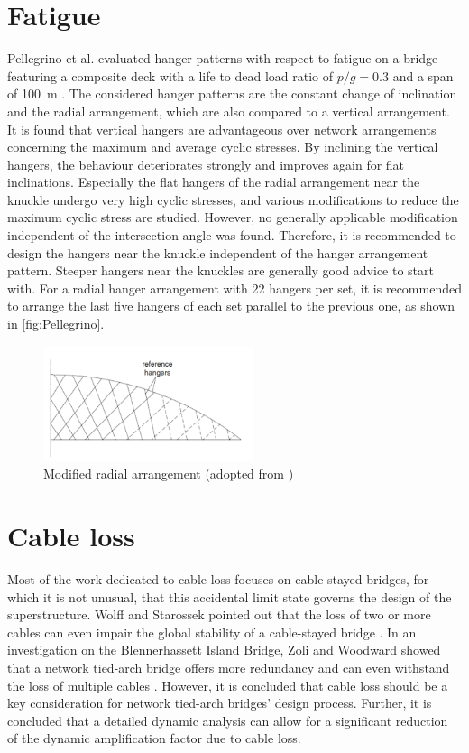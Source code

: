 \section{Fatigue} \label{sec:rev_fat}
Pellegrino et al. evaluated hanger patterns with respect to fatigue on a bridge featuring a composite deck with a life to dead load ratio of $p/g=0.3$ and a span of \SI{100}{m} \cite{Pellegrino}. The considered hanger patterns are the constant change of inclination and the radial arrangement, which are also compared to a vertical arrangement. It is found that vertical hangers are advantageous over network arrangements concerning the maximum and average cyclic stresses. By inclining the vertical hangers, the behaviour deteriorates strongly and improves again for flat inclinations. Especially the flat hangers of the radial arrangement near the knuckle undergo very high cyclic stresses, and various modifications to reduce the maximum cyclic stress are studied. However, no generally applicable modification independent of the intersection angle was found. Therefore, it is recommended to design the hangers near the knuckle independent of the hanger arrangement pattern. Steeper hangers near the knuckles are generally good advice to start with. For a radial hanger arrangement with 22 hangers per set, it is recommended to arrange the last five hangers of each set parallel to the previous one, as shown in \autoref{fig:Pellegrino}.
\begin{figure}[H]
    \centering
    \includegraphics[trim={0 0.6cm 0 0.4cm},clip, width=0.55\textwidth]{Pictures/PellegrinoArrangement.png}
    \caption{Modified radial arrangement (adopted from \cite{Pellegrino})}
    \label{fig:Pellegrino}
\end{figure}


\section{Cable loss} \label{sec:rev_loss}

Most of the work dedicated to cable loss focuses on cable-stayed bridges, for which it is not unusual, that this accidental limit state governs the design of the superstructure. Wolff and Starossek pointed out that the loss of two or more cables can even impair the global stability of a cable-stayed bridge \cite{Wolff}. In an investigation on the Blennerhassett Island Bridge, Zoli and Woodward showed that a network tied-arch bridge offers more redundancy and can even withstand the loss of multiple cables \cite{Zoli}. However, it is concluded that cable loss should be a key consideration for network tied-arch bridges' design process. Further, it is concluded that a detailed dynamic analysis can allow for a significant reduction of the dynamic amplification factor due to cable loss.

